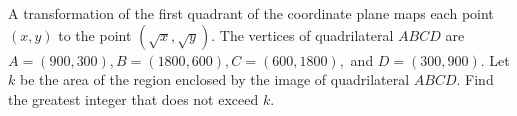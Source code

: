 A transformation of the first quadrant of the coordinate plane maps each point $(x,y)$ to the point $(\sqrt{x},\sqrt{y}).$  The vertices of quadrilateral $ABCD$ are $A=(900,300), B=(1800,600), C=(600,1800),$ and $D=(300,900).$  Let $k$ be the area of the region enclosed by the image of quadrilateral $ABCD.$  Find the greatest integer that does not exceed $k.$